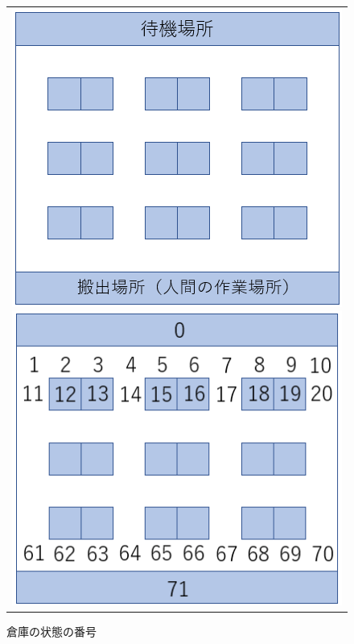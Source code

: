 \begin{figure}[htbp]
  \begin{center}
    \begin{tabular}{c}

      \begin{minipage}{0.5\hsize}
        \begin{center}
          \includegraphics[scale=0.38]{figures/Warehouse.pdf}
          \caption{倉庫}
          \label{fig:Warehouse}
        \end{center}
      \end{minipage}

      \begin{minipage}{0.5\hsize}
        \begin{center}
          \includegraphics[scale=0.38]{figures/Warehouse_state.pdf}
          \caption{倉庫の状態の番号}
          \label{fig:Warehouse_state}
        \end{center}
      \end{minipage}
      
    \end{tabular}
  \end{center}
\end{figure}

